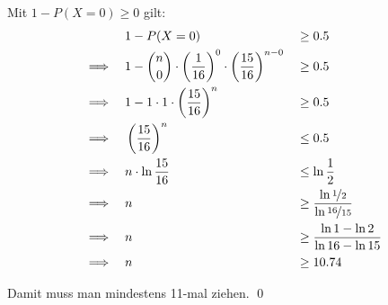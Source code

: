 \documentclass{abgabe}
\begin{document}
\begin{questions}
\begin{parts}
\begin{solution}
            Mit $1 - P(X = 0) \geq 0$ gilt: 
            \begin{alignat*}{2}
                               & 1 - P(X = 0)                                                                              &  & \geq 0.5                                   \\ 
                \implies \quad & 1 - \binom{n}{0} \cdot \left(\frac{1}{16}\right)^0 \cdot \left(\frac{15}{16}\right)^{n-0} &  & \geq 0.5                                   \\
                \implies \quad & 1 - 1 \cdot 1 \cdot \left(\frac{15}{16}\right)^{n}                                        &  & \geq 0.5                                   \\
                \implies \quad & \left(\frac{15}{16}\right)^{n}                                                            &  & \leq 0.5                                   \\
                \implies \quad & n \cdot \ln \frac{15}{16}                                                                &  & \leq \ln \frac{1}{2}                      \\
                \implies \quad & n                                                                                         &  & \geq \frac{\ln \nicefrac{1}{2}}{\ln \nicefrac{16}{15}} \\
                \implies \quad & n                                                                                         &  & \geq \frac{\ln 1 - \ln 2}{\ln 16 - \ln 15} \\
                \implies \quad & n                                                                                         &  & \geq 10.74                               \\
            \end{alignat*}
            
            Damit muss man mindestens 11-mal ziehen. \qed
        \end{solution}
    \end{parts}
\end{questions}
\end{document}
